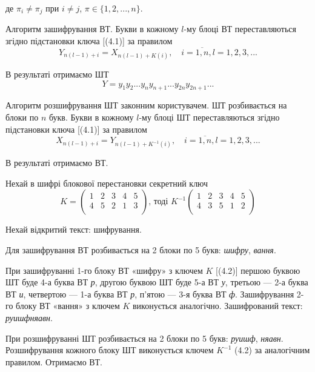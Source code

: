 де $\pi_i \neq \pi_j$ при $i \neq j$, $\pi \in \{1, 2, ..., n\}$.

Алгоритм зашифрування ВТ. Букви в кожному $l$-му блоці ВТ
переставляються згідно підстановки ключа [(4.1)] за правилом
$$Y_{n(l-1) + i} = X_{n(l-1) + K(i)}, \quad i = \overline{1, n}, l = 1, 2, 3, ...$$

В результаті отримаємо ШТ
$$Y = y_1 y_2 ... y_n y_{n+1} ... y_{2n} y_{2n+1} ...$$

Алгоритм розшифрування ШТ законним користувачем. ШТ розбивається на
блоки по $n$ букв. Букви в кожному $l$-му блоці ШТ переставляються згідно
підстановки ключа [(4.1)] за правилом
$$X_{n(l-1) + i} = Y_{n(l-1) + K^{-1}(i)}, \quad i = \overline{1, n}, l = 1, 2, 3, ...$$

В результаті отримаємо ВТ. 

\begin{example}
    Нехай в шифрі блокової перестановки секретний ключ
    \begin{equation}
        K = \begin{pmatrix}
            1 & 2 & 3 & 4 & 5 \\
            4 & 5 & 2 & 1 & 3 \\
        \end{pmatrix}
        \text{, тоді }
        K^{-1} \begin{pmatrix}
            1 & 2 & 3 & 4 & 5 \\
            4 & 3 & 5 & 1 & 2 \\
        \end{pmatrix}
    \end{equation}
\end{example}

Нехай відкритий текст: шифрування.

Для зашифрування ВТ розбивається на 2 блоки по 5 букв:
\textit{шифру}, \textit{вання}.

При зашифруванні 1-го блоку ВТ «шифру» з ключем $K$ [(4.2)] першою
буквою ШТ буде 4-а буква ВТ \textit{р}, другою буквою ШТ буде 5-а ВТ \textit{у}, третьою
--- 2-а буква ВТ \textit{и}, четвертою --- 1-а буква ВТ \textit{р}, п’ятою --- 3-я буква ВТ \textit{ф}.
Зашифрування 2-го блоку ВТ «вання» з ключем $K$ виконується аналогічно.
Зашифрований текст: \textit{руишфняавн}.

При розшифруванні ШТ розбивається на 2 блоки по 5 букв:
\textit{руишф}, \textit{няавн}. Розшифрування кожного блоку ШТ виконується ключем
$K^{-1}$ (4.2) за аналогічним правилом. Отримаємо ВТ.

